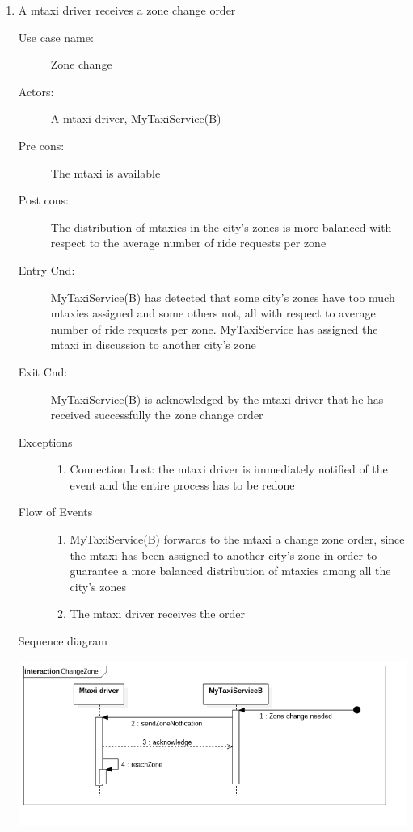 \documentclass[11pt,titlepage]{article} %
\begin{document}
\begin{enumerate}
	      \item A mtaxi driver receives a zone change order
		\begin{description}
		        \item [Use case name:] Zone change
		        \item [Actors:] A mtaxi driver, MyTaxiService(B)
		        \item [Pre cons:] The mtaxi is available
		        \item [Post cons:] The distribution of mtaxies in the city's zones is more balanced
		        with respect to the average number of ride requests per zone
		        \item [Entry Cnd:] MyTaxiService(B) has detected that some city's zones have too much mtaxies assigned
		        and some others not, all with respect to average number of ride requests per zone. MyTaxiService
		        has assigned the mtaxi in discussion to another city's zone
		        \item [Exit Cnd:] MyTaxiService(B) is acknowledged by the mtaxi driver that he has received successfully
		        the zone change order
		        \item [Exceptions]\hfill
			\begin{enumerate}
			          \item Connection Lost: the mtaxi driver is immediately notified of the event and the entire process has to be redone
			\end{enumerate}
		        \item [Flow of Events]\hfill
			\begin{enumerate}
			          \item MyTaxiService(B) forwards to the mtaxi a change zone order, since the mtaxi has been assigned to another city's zone in order to guarantee
			          a more balanced distribution of mtaxies among all the city's zones
			          \item The mtaxi driver receives the order
			\end{enumerate}
		\end{description}
		Sequence diagram
		\begin{center}
		\includegraphics[scale=0.52]{usecase10.png}
		\end{center}



\end{enumerate}
\end{document}
